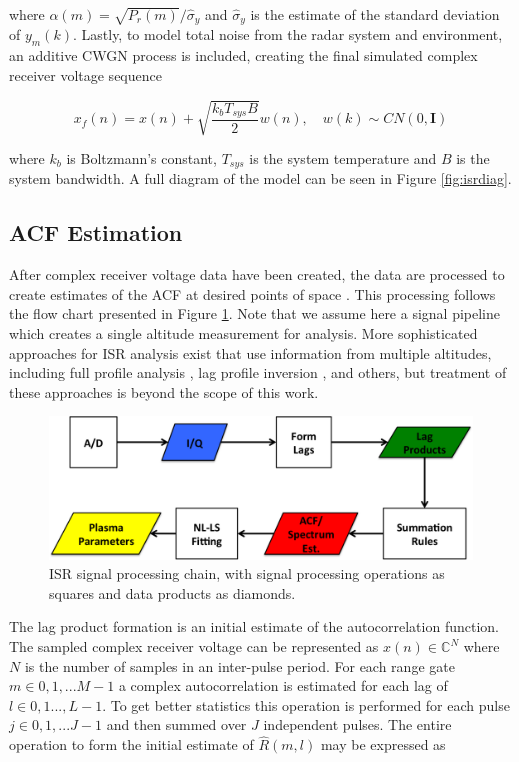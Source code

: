 \documentclass[draft,ras]{agutex}
\begin{document}
\begin{article}
\noindent where $\alpha(m) = \sqrt{P_r(m)}/\widehat{\sigma}_y$ and $\widehat{\sigma}_y$ is the estimate of the standard deviation of $y_m(k)$. Lastly, to model total noise from the radar system and environment, an additive CWGN process is included, creating the final simulated complex receiver voltage sequence

\begin{equation}
\label{eq:addnoise}
x_f(n) = x(n) +\sqrt{\frac{k_bT_{sys}B}{2}} w(n), \quad w(k)\sim CN(0,\mathbf{I})
\end{equation}

\noindent where $k_b$ is Boltzmann's constant, $T_{sys}$ is the system temperature and $B$ is the system bandwidth.
A full diagram of the model can be seen in Figure \ref{fig:isrdiag}.


\subsection{ACF Estimation}
\label{sec:acf}
After complex receiver voltage data have been created, the data are processed to create estimates of the ACF at desired points of space \citep[see, e.g.,][]{farley1969,nygren1996}. This processing follows the flow chart presented in Figure \ref{fig:chain}.  Note that we assume here a signal pipeline which creates a single altitude measurement for analysis.  More sophisticated approaches for ISR analysis exist that use information from multiple altitudes, including full profile analysis \citep{RDS:RDS3308}, lag profile inversion \citep{Virtanen:20082vx}, and others, but treatment of these approaches is beyond the scope of this work.

\begin{figure}[!t]
\centering
\includegraphics[width=6in]{datastackchain}
\caption{ISR signal processing chain, with signal processing operations as squares and data products as diamonds.}
\label{fig:chain}
\end{figure}


The lag product formation is an initial estimate of the autocorrelation function. The sampled complex receiver voltage can be represented as $x(n) \in\mathbb{C}^N$ where $N$ is the number of samples in an inter-pulse period. For each range gate $m\in 0,1,...M-1$ a complex autocorrelation is estimated for each lag of $l \in 0,1...,L-1$.  To get better statistics this operation is performed for each pulse $j\in 0,1,...J-1$ and then summed over $J$ independent pulses. The entire operation to form the initial estimate of $\widehat{R}(m,l)$ may be expressed as


\end{article}
\end{document}
